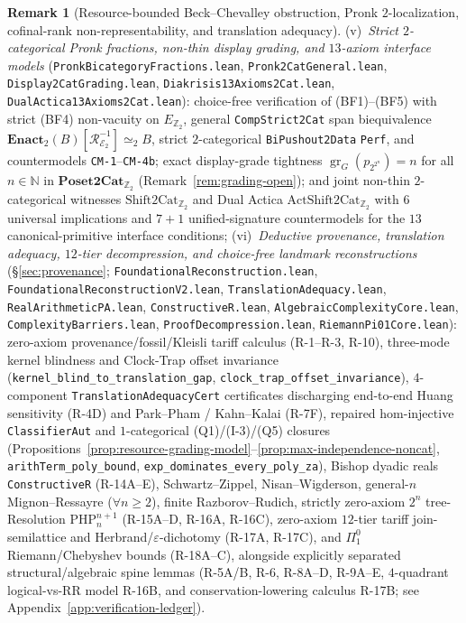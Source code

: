 \documentclass[11pt]{article}
\theoremstyle{plain}
\theoremstyle{definition}
\newtheorem{remark}[theorem]{Remark}
\newcommand{\gr}{\operatorname{gr}}
\newcommand{\cE}{\mathcal{E}}
\begin{document}
\begin{remark}[Resource-bounded Beck--Chevalley obstruction, Pronk $2$-localization, cofinal-rank non-representability, and translation adequacy]
(v)~\emph{Strict $2$-categorical Pronk fractions, non-thin display grading, and $13$-axiom interface models} (\texttt{PronkBicategoryFractions.lean}, \texttt{Pronk2CatGeneral.lean}, \texttt{Display2CatGrading.lean}, \texttt{Diakrisis13Axioms2Cat.lean}, \texttt{DualActica13Axioms2Cat.lean}): choice-free verification of (BF1)--(BF5) with strict (BF4) non-vacuity on $E_{\mathbb{Z}_2}$, general \texttt{CompStrict2Cat} span biequivalence $\mathbf{Enact}_2(B)[\mathcal{R}_{\cE_2}^{-1}] \simeq_2 B$, strict $2$-categorical \texttt{BiPushout2Data} \texttt{Perf}, and countermodels \texttt{CM-1}--\texttt{CM-4b}; exact display-grade tightness $\gr_G(p_{2^{2^n}}) = n$ for all $n \in \mathbb{N}$ in $\mathbf{Poset2Cat}_{\mathbb{Z}_2}$ (Remark~\ref{rem:grading-open}); and joint non-thin $2$-categorical witnesses $\mathrm{Shift2Cat}_{\mathbb{Z}_2}$ and Dual Actica $\mathrm{ActShift2Cat}_{\mathbb{Z}_2}$ with $6$ universal implications and $7+1$ unified-signature countermodels for the $13$ canonical-primitive interface conditions;
(vi)~\emph{Deductive provenance, translation adequacy, $12$-tier decompression, and choice-free landmark reconstructions} (\S\ref{sec:provenance}; \texttt{FoundationalReconstruction.lean}, \texttt{FoundationalReconstructionV2.lean}, \texttt{TranslationAdequacy.lean}, \texttt{RealArithmeticPA.lean}, \texttt{ConstructiveR.lean}, \texttt{AlgebraicComplexityCore.lean}, \texttt{ComplexityBarriers.lean}, \texttt{ProofDecompression.lean}, \texttt{RiemannPi01Core.lean}): zero-axiom provenance/fossil/Kleisli tariff calculus (R-1--R-3, R-10), three-mode kernel blindness and Clock-Trap offset invariance (\texttt{kernel\_\allowbreak blind\_\allowbreak to\_\allowbreak translation\_\allowbreak gap}, \texttt{clock\_\allowbreak trap\_\allowbreak offset\_\allowbreak invariance}), $4$-component \texttt{TranslationAdequacyCert} certificates discharging end-to-end Huang sensitivity (R-4D) and Park--Pham / Kahn--Kalai (R-7F), repaired hom-injective \texttt{ClassifierAut} and $1$-categorical (Q1)/(I-3)/(Q5) closures (Propositions~\ref{prop:resource-grading-model}--\ref{prop:max-independence-noncat}, \texttt{arithTerm\_\allowbreak poly\_\allowbreak bound}, \texttt{exp\_\allowbreak dominates\_\allowbreak every\_\allowbreak poly\_\allowbreak za}), Bishop dyadic reals \texttt{ConstructiveR} (R-14A--E), Schwartz--Zippel, Nisan--Wigderson, general-$n$ Mignon--Ressayre ($\forall n \ge 2$), finite Razborov--Rudich, strictly zero-axiom $2^n$ tree-Resolution $\mathrm{PHP}_n^{n+1}$ (R-15A--D, R-16A, R-16C), zero-axiom $12$-tier tariff join-semilattice and Herbrand/$\varepsilon$-dichotomy (R-17A, R-17C), and $\Pi^0_1$ Riemann/Chebyshev bounds (R-18A--C), alongside explicitly separated structural/algebraic spine lemmas (R-5A/B, R-6, R-8A--D, R-9A--E, $4$-quadrant logical-vs-RR model R-16B, and conservation-lowering calculus R-17B; see Appendix~\ref{app:verification-ledger}).
\end{remark}
\end{document}
